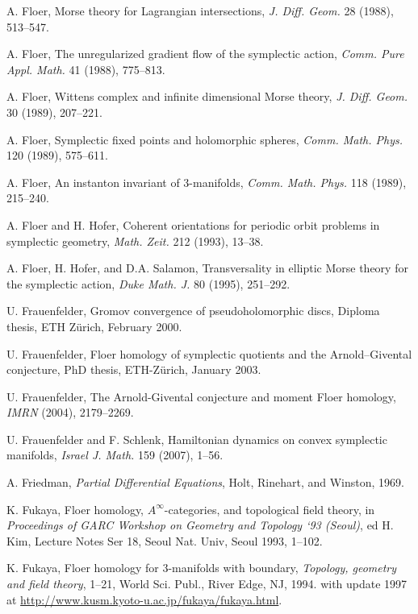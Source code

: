  A. Floer, Morse theory for Lagrangian intersections, \emph{J. Diff. Geom.} 28 (1988), 513–547.

 A. Floer, The unregularized gradient flow of the symplectic action, \emph{Comm. Pure Appl. Math.} 41 (1988), 775–813.

 A. Floer, Wittens complex and infinite dimensional Morse theory, \emph{J. Diff. Geom.} 30 (1989), 207–221.

 A. Floer, Symplectic fixed points and holomorphic spheres, \emph{Comm. Math. Phys.} 120 (1989), 575–611.

 A. Floer, An instanton invariant of 3-manifolds, \emph{Comm. Math. Phys.} 118 (1989), 215–240.

 A. Floer and H. Hofer, Coherent orientations for periodic orbit problems in symplectic geometry, \emph{Math. Zeit.} 212 (1993), 13–38.

 A. Floer, H. Hofer, and D.A. Salamon, Transversality in elliptic Morse theory for the symplectic action, \emph{Duke Math. J.} 80 (1995), 251–292.

 U. Frauenfelder, Gromov convergence of pseudoholomorphic discs, Diploma thesis, ETH Zürich, February 2000.

 U. Frauenfelder, Floer homology of symplectic quotients and the Arnold–Givental conjecture, PhD thesis, ETH-Zürich, January 2003.

 U. Frauenfelder, The Arnold-Givental conjecture and moment Floer homology, \emph{IMRN} (2004), 2179–2269.

 U. Frauenfelder and F. Schlenk, Hamiltonian dynamics on convex symplectic manifolds, \emph{Israel J. Math.} 159 (2007), 1–56.

 A. Friedman, \emph{Partial Differential Equations}, Holt, Rinehart, and Winston, 1969.

 K. Fukaya, Floer homology, $A^{\infty}$-categories, and topological field theory, in \emph{Proceedings of GARC Workshop on Geometry and Topology ‘93 (Seoul)}, ed H. Kim, Lecture Notes Ser 18, Seoul Nat. Univ, Seoul 1993, 1–102.

 K. Fukaya, Floer homology for 3-manifolds with boundary, \emph{Topology, geometry and field theory}, 1–21, World Sci. Publ., River Edge, NJ, 1994. with update 1997 at \url{http://www.kusm.kyoto-u.ac.jp/fukaya/fukaya.html}.

